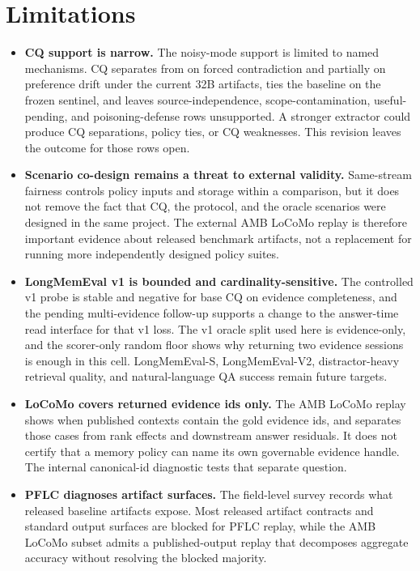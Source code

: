 \section{Limitations}
\label{sec:limitations}

\begin{itemize}
\item \textbf{CQ support is narrow.} The noisy-mode support is limited to named
mechanisms. CQ separates from  on forced contradiction and
partially on preference drift under the current 32B artifacts, ties the
\memzero{} baseline on the frozen sentinel, and leaves source-independence,
scope-contamination, useful-pending, and poisoning-defense rows unsupported.
A stronger extractor could produce CQ separations, policy ties, or CQ
weaknesses. This revision leaves the outcome for those rows open.

\item \textbf{Scenario co-design remains a threat to external validity.}
Same-stream fairness controls policy inputs and storage within a comparison,
but it does not remove the fact that CQ, the protocol, and the oracle scenarios
were designed in the same project. The external AMB LoCoMo replay is therefore
important evidence about released benchmark artifacts, not a replacement for
running more independently designed policy suites.

\item \textbf{LongMemEval v1 is bounded and cardinality-sensitive.} The
controlled v1 probe is stable and negative for base CQ on evidence
completeness, and the pending multi-evidence follow-up supports a
change to the answer-time read interface for that v1 loss. The v1 oracle split
used here is evidence-only, and the scorer-only random floor shows why
returning two evidence sessions is enough in this cell. LongMemEval-S,
LongMemEval-V2,
distractor-heavy retrieval quality, and natural-language QA success remain
future targets.

\item \textbf{LoCoMo covers returned evidence ids only.}
The AMB LoCoMo replay shows when published contexts contain the gold evidence
ids, and separates those cases from rank effects and downstream answer
residuals. It does not certify that a memory policy can name its own
governable evidence handle. The internal canonical-id diagnostic tests that
separate question.

\item \textbf{PFLC diagnoses artifact surfaces.} The field-level survey
records what released baseline artifacts expose. Most released artifact
contracts and standard output surfaces are blocked for PFLC replay, while the
AMB LoCoMo subset admits a published-output replay that decomposes aggregate
accuracy without resolving the blocked majority.


\end{itemize}
